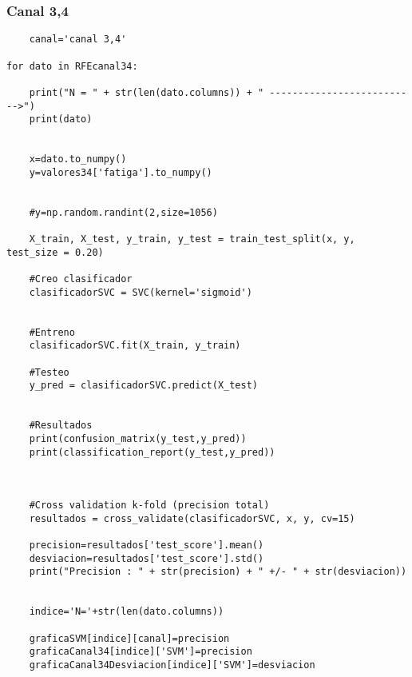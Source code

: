     \subsubsection{{Canal 3,4}}
    \begin{lstlisting}
    canal='canal 3,4'

for dato in RFEcanal34:
    
    print("N = " + str(len(dato.columns)) + " -------------------------->")
    print(dato)
    
    
    x=dato.to_numpy()
    y=valores34['fatiga'].to_numpy()

    
    #y=np.random.randint(2,size=1056)
    
    X_train, X_test, y_train, y_test = train_test_split(x, y, test_size = 0.20)
    
    #Creo clasificador
    clasificadorSVC = SVC(kernel='sigmoid')


    #Entreno
    clasificadorSVC.fit(X_train, y_train)

    #Testeo 
    y_pred = clasificadorSVC.predict(X_test)


    #Resultados
    print(confusion_matrix(y_test,y_pred))
    print(classification_report(y_test,y_pred))



    #Cross validation k-fold (precision total)
    resultados = cross_validate(clasificadorSVC, x, y, cv=15)
    
    precision=resultados['test_score'].mean()
    desviacion=resultados['test_score'].std()
    print("Precision : " + str(precision) + " +/- " + str(desviacion))
    
    
    indice='N='+str(len(dato.columns))
    
    graficaSVM[indice][canal]=precision
    graficaCanal34[indice]['SVM']=precision
    graficaCanal34Desviacion[indice]['SVM']=desviacion
    \end{lstlisting}
    
